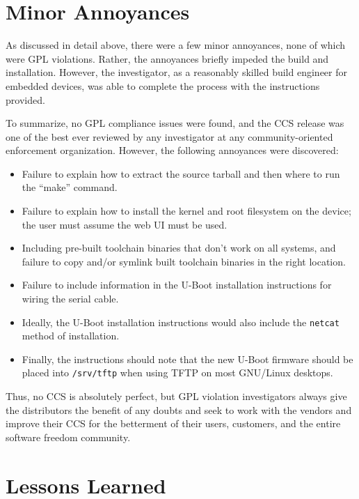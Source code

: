 \section{Minor Annoyances}

As discussed in detail above, there were a few minor annoyances, none of
which were GPL violations.  Rather, the annoyances briefly impeded the
build and installation.  However, the investigator, as a reasonably skilled
build engineer for embedded devices, was able to complete the process with
the instructions provided.

To summarize, no GPL compliance issues were found, and the CCS release was
one of the best ever reviewed by any investigator at any community-oriented
enforcement organization.  However, the following annoyances were discovered:

\begin{itemize}
\item Failure to explain how to extract the source tarball and then where to run the
  ``make'' command.
\item Failure to explain how to install the kernel and root filesystem on the
  device; the user must assume the web UI must be used.

\item Including pre-built toolchain binaries that don't work on all systems,
  and failure to copy and/or symlink built toolchain binaries in the right location.

\item Failure to include information in the U-Boot installation instructions for
  wiring the serial cable.

\item Ideally, the U-Boot installation instructions would also include the
  {\tt netcat} method of installation.

\item Finally, the instructions should note that the new U-Boot firmware
  should be placed into \texttt{/srv/tftp} when using TFTP on most GNU/Linux
  desktops.
\end{itemize}

Thus, no CCS is absolutely perfect, but GPL violation investigators always
give the distributors the benefit of any doubts and seek to work with the
vendors and improve their CCS for the betterment of their users, customers,
and the entire software freedom community.

\section{Lessons Learned}

